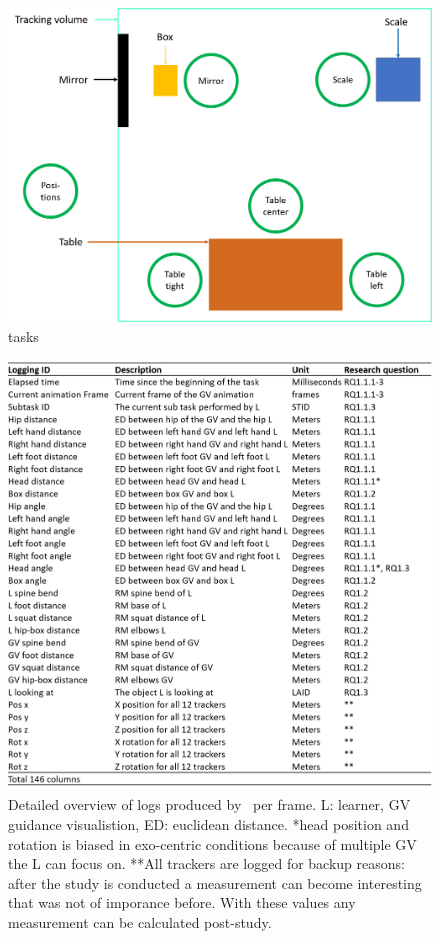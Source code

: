 \begin{figure}[htb]
	\centering
	\includegraphics[width=\textwidth]{figures/learner_positions.png}
	\caption[Description of tasks]{tasks}
	\label{fig:learner_positions}
\end{figure}

\begin{figure}[htb]
	\centering
	\includegraphics[width=\textwidth]{figures/logging_detail.png}
	\caption[logging detail]{Detailed overview of logs produced by \exgo\ per frame. L: learner, GV guidance visualistion, ED: euclidean distance. *head position and rotation is biased in exo-centric conditions because of multiple GV the L can focus on. **All trackers are logged for backup reasons: after the study is conducted a measurement can become interesting that was not of imporance before. With these values any measurement can be calculated post-study.}
	\label{fig:logging_detail}
\end{figure}

